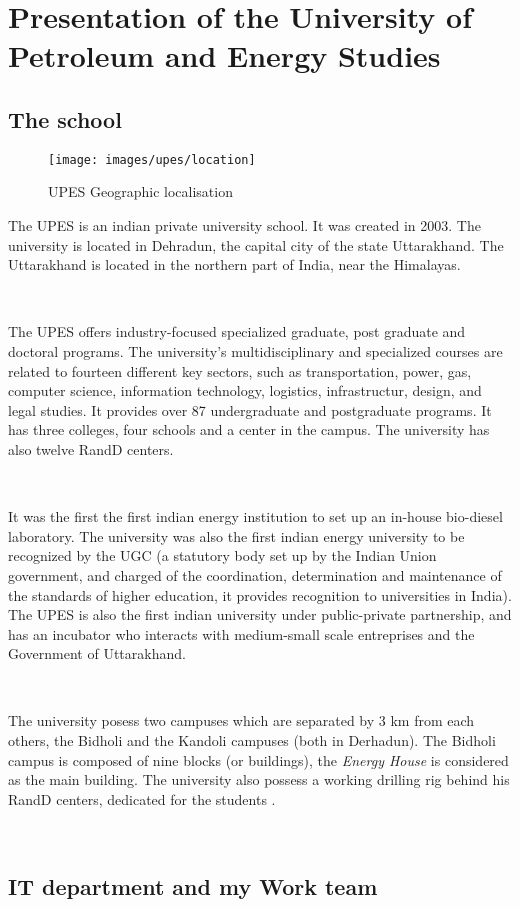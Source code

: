 \chapter{Presentation of the University of Petroleum and Energy Studies}


\section{The school}


\begin{wrapfigure}{r}{0.5\textwidth}
	\centering
	\texttt{[image: images/upes/location]}	
	\caption{UPES Geographic localisation \cite{bib:upes:map}}
	\label{fig:upes:localisation}
\end{wrapfigure}

The \acrfull{UPES} is an indian private university school. It was created in 2003. The university is located in Dehradun, the capital city of the state Uttarakhand. The Uttarakhand is located in the northern part of India, near the Himalayas.  

~~

The \acrshort{UPES} offers industry-focused specialized graduate, post graduate and doctoral programs. The university's  multidisciplinary and specialized courses are related to fourteen  different key sectors, such as transportation, power, gas, computer science, information technology, logistics, infrastructur, design, and legal studies. It provides over 87 undergraduate and postgraduate programs. It has three colleges, four schools and a center in the campus. The university has also twelve \acrfull{RandD} centers. 

~~

It was the first the first indian energy institution to set up an in-house bio-diesel laboratory. The university was also the first indian energy university to be recognized by the \acrfull{UGC} (a statutory body set up by the Indian Union government, and charged of the coordination, determination and maintenance of the standards of higher education, it provides recognition to universities in India). The \acrshort{UPES} is also the first indian university under public-private partnership, and has an incubator who interacts with medium-small scale entreprises and the Government of Uttarakhand. 

~~

The university posess two campuses which are separated by 3 km from each others, the Bidholi and the Kandoli campuses (both in Derhadun). The Bidholi campus is composed of nine blocks (or buildings), the \emph{Energy House} is considered as the main building. The university also possess a working drilling rig behind his \acrshort{RandD} centers, dedicated for the students \cite{bib:upes:wikipedia}.

~~ 



\section{IT department and my Work team}


